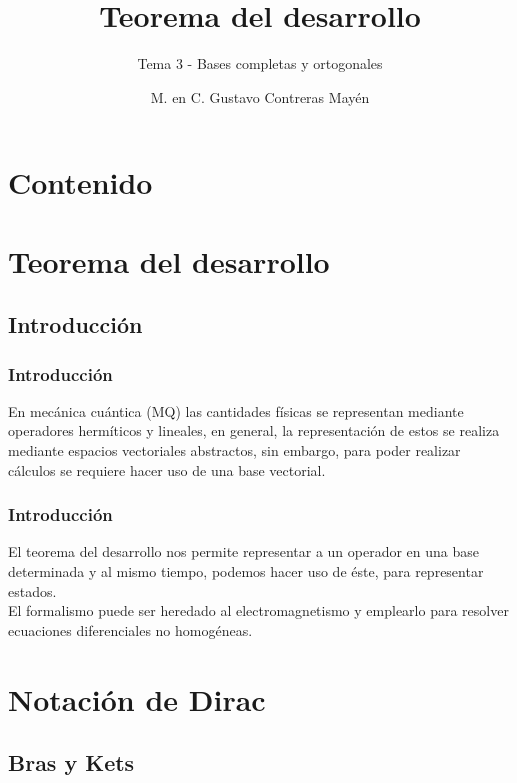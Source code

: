 \documentclass[12pt]{beamer}
\date{}
\title{\large{Teorema del desarrollo}}
\subtitle{Tema 3 - Bases completas y ortogonales}
\author{M. en C. Gustavo Contreras Mayén}
\begin{document}
\maketitle
\fontsize{14}{14}\selectfont
{}

\section*{Contenido}

\section{Teorema del desarrollo}
\subsection{Introducción}

\begin{frame}
\frametitle{Introducción}
En mecánica cuántica (MQ) las cantidades físicas se representan mediante operadores hermíticos y lineales, en general, la representación de estos se realiza mediante espacios vectoriales abstractos, sin embargo, para poder realizar cálculos se requiere hacer uso de una base vectorial.
\end{frame}
\begin{frame}
\frametitle{Introducción}
El teorema del desarrollo nos permite representar a un operador en una base determinada y al mismo tiempo, podemos hacer uso de éste, para representar estados.
\\
\bigskip
\pause
El formalismo puede ser heredado al electromagnetismo y emplearlo para resolver ecuaciones diferenciales no homogéneas.
\end{frame}

\section{Notación de Dirac}
\subsection{Bras y Kets}
\end{document}
